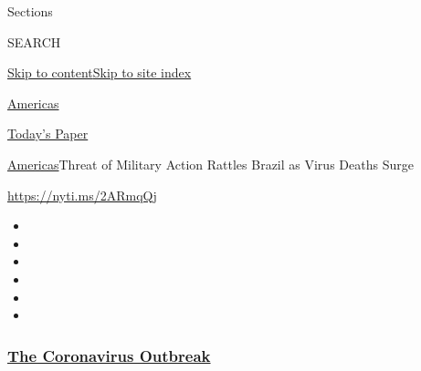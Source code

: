 Sections

SEARCH

\protect\hyperlink{site-content}{Skip to
content}\protect\hyperlink{site-index}{Skip to site index}

\href{https://www.nytimes3xbfgragh.onion/section/world/americas}{Americas}

\href{https://myaccount.nytimes3xbfgragh.onion/auth/login?response_type=cookie\&client_id=vi}{}

\href{https://www.nytimes3xbfgragh.onion/section/todayspaper}{Today's
Paper}

\href{/section/world/americas}{Americas}\textbar{}Threat of Military
Action Rattles Brazil as Virus Deaths Surge

\url{https://nyti.ms/2ARmqQj}

\begin{itemize}
\item
\item
\item
\item
\item
\item
\end{itemize}

\hypertarget{the-coronavirus-outbreak}{%
\subsubsection{\texorpdfstring{\href{https://www.nytimes3xbfgragh.onion/news-event/coronavirus?name=styln-coronavirus-national\&region=TOP_BANNER\&block=storyline_menu_recirc\&action=click\&pgtype=Article\&impression_id=22258f50-f4bb-11ea-ad23-071b6226df98\&variant=undefined}{The
Coronavirus
Outbreak}}{The Coronavirus Outbreak}}\label{the-coronavirus-outbreak}}

